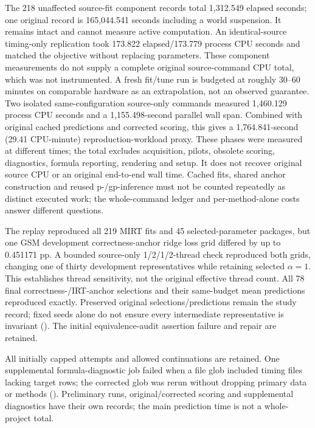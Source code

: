 \documentclass{article}
\begin{document}
The 218 unaffected source-fit component records total 1,312.549 elapsed seconds; one original record is 165,044.541 seconds including a world suspension. It remains intact and cannot measure active computation. An identical-source timing-only replication took 173.822 elapsed/173.779 process CPU seconds and matched the objective without replacing parameters. These component measurements do not supply a complete original source-command CPU total, which was not instrumented. A fresh fit/tune run is budgeted at roughly 30--60 minutes on comparable hardware as an extrapolation, not an observed guarantee. Two isolated same-configuration source-only commands measured 1,460.129 process CPU seconds and a 1,155.498-second parallel wall span. Combined with original cached predictions and corrected scoring, this gives a 1,764.841-second (29.41 CPU-minute) reproduction-workload proxy. These phases were measured at different times; the total excludes acquisition, pilots, obsolete scoring, diagnostics, formula reporting, rendering and setup. It does not recover original source CPU or an original end-to-end wall time. Cached fits, shared anchor construction and reused p-/gp-inference must not be counted repeatedly as distinct executed work; the whole-command ledger and per-method-alone costs answer different questions.

The replay reproduced all 219 MIRT fits and 45 selected-parameter packages, but one GSM development correctness-anchor ridge loss grid differed by up to 0.451171 pp. A bounded source-only 1/2/1/2-thread check reproduced both grids, changing one of thirty development representatives while retaining selected $\alpha=1$. This establishes thread sensitivity, not the original effective thread count. All 78 final correctness-/IRT-anchor selections and their same-budget mean predictions reproduced exactly. Preserved original selections/predictions remain the study record; fixed seeds alone do not ensure every intermediate representative is invariant (). The initial equivalence-audit assertion failure and repair are retained.

All initially capped attempts and allowed continuations are retained. One supplemental formula-diagnostic job failed when a file glob included timing files lacking target rows; the corrected glob was rerun without dropping primary data or methods (). Preliminary runs, original/corrected scoring and supplemental diagnostics have their own records; the main prediction time is not a whole-project total.
\end{document}
